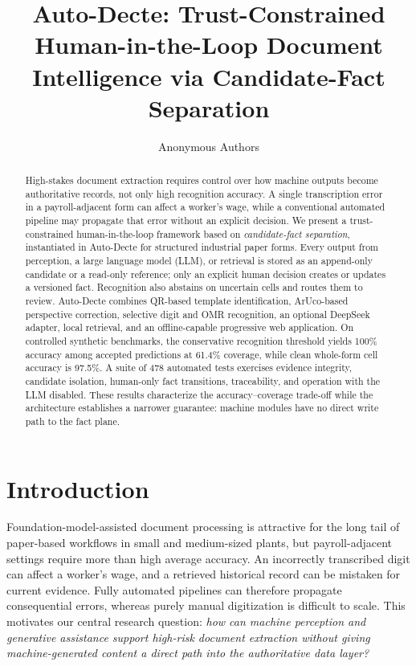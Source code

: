 \documentclass[runningheads]{llncs}
\title{Auto-Decte: Trust-Constrained Human-in-the-Loop Document Intelligence via Candidate-Fact Separation}
\author{Anonymous Authors}
\institute{Anonymous Institution}
\begin{document}
\maketitle

\begin{abstract}
High-stakes document extraction requires control over how machine outputs become authoritative records, not only high recognition accuracy. A single transcription error in a payroll-adjacent form can affect a worker's wage, while a conventional automated pipeline may propagate that error without an explicit decision. We present a trust-constrained human-in-the-loop framework based on \emph{candidate-fact separation}, instantiated in Auto-Decte for structured industrial paper forms. Every output from perception, a large language model (LLM), or retrieval is stored as an append-only candidate or a read-only reference; only an explicit human decision creates or updates a versioned fact. Recognition also abstains on uncertain cells and routes them to review. Auto-Decte combines QR-based template identification, ArUco-based perspective correction, selective digit and OMR recognition, an optional DeepSeek adapter, local retrieval, and an offline-capable progressive web application. On controlled synthetic benchmarks, the conservative recognition threshold yields 100\% accuracy among accepted predictions at 61.4\% coverage, while clean whole-form cell accuracy is 97.5\%. A suite of 478 automated tests exercises evidence integrity, candidate isolation, human-only fact transitions, traceability, and operation with the LLM disabled. These results characterize the accuracy--coverage trade-off while the architecture establishes a narrower guarantee: machine modules have no direct write path to the fact plane.
\end{abstract}


\section{Introduction}
Foundation-model-assisted document processing is attractive for the long tail of paper-based workflows in small and medium-sized plants, but payroll-adjacent settings require more than high average accuracy. An incorrectly transcribed digit can affect a worker's wage, and a retrieved historical record can be mistaken for current evidence. Fully automated pipelines can therefore propagate consequential errors, whereas purely manual digitization is difficult to scale. This motivates our central research question: \emph{how can machine perception and generative assistance support high-risk document extraction without giving machine-generated content a direct path into the authoritative data layer?}
\end{document}
